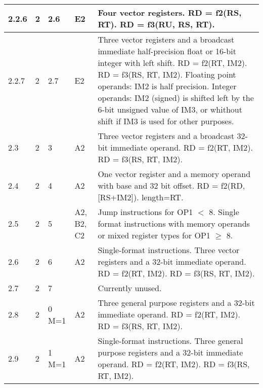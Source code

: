 \documentclass[forwardcom.tex]{subfiles}
\begin{document}
\begin{longtable} {|p{10mm}|p{6mm}|p{9mm}|p{7mm}|p{80mm}|}
\hline
2.2.6 & 2 & 2.6 & E2 & Four vector registers.\newline 
RD = f2(RS, RT). \newline 
RD = f3(RU, RS, RT).\\

\hline
2.2.7 & 2 & 2.7 & E2 & Three vector registers and a broadcast immediate half-precision float or 16-bit integer with left shift.\newline 
RD = f2(RT, IM2). \newline 
RD = f3(RS, RT, IM2).\newline
Floating point operands: IM2 is half precision.
Integer operands: IM2 (signed) is shifted left by the 6-bit unsigned value of IM3, or whithout shift if IM3 is used for other purposes. \\

\hline
2.3 & 2 & 3 & A2 & Three vector registers and a broadcast 32-bit immediate operand.\newline 
RD = f2(RT, IM2). \newline 
RD = f3(RS, RT, IM2).\\

\hline
2.4 & 2 & 4 & A2 & One vector register and a memory operand with base and 32 bit offset.\newline
RD = f2(RD, [RS+IM2]). length=RT.\\

\hline
2.5 & 2 & 5 & A2, B2, C2 & Jump instructions for OP1 $<$ 8. Single format instructions with memory operands or mixed register types for OP1 $\geq$ 8.\\

\hline
2.6 & 2 & 6 & A2 & Single-format instructions. Three vector registers and a 32-bit immediate operand.\newline 
RD = f2(RT, IM2). \newline 
RD = f3(RS, RT, IM2).\\

\hline
2.7 & 2 & 7 &  & Currently unused.\\

\hline
2.8 & 2 & 0 M=1 & A2 & Three general purpose registers and a 32-bit immediate operand.\newline 
RD = f2(RT, IM2). \newline 
RD = f3(RS, RT, IM2).\\

\hline
2.9 & 2 & 1 M=1 & A2 & Single-format instructions. Three general purpose registers and a 32-bit immediate operand.\newline 
RD = f2(RT, IM2). \newline 
RD = f3(RS, RT, IM2).\\



\end{longtable}
\end{document}
